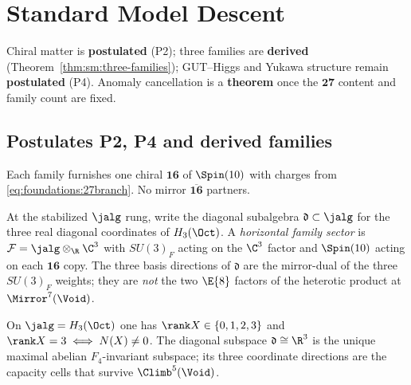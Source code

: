 \section{Standard Model Descent}
\label{sec:sm}

Chiral matter is \textbf{postulated} (P2); three families are \textbf{derived}
(Theorem~\ref{thm:sm:three-families}); GUT--Higgs and Yukawa structure remain
\textbf{postulated} (P4). Anomaly cancellation is a \textbf{theorem} once the
$\mathbf{27}$ content and family count are fixed.

\subsection{Postulates P2, P4 and derived families}
\label{sec:sm:postulates}

\begin{postulate}\label{post:sm:P2}
Each family furnishes one chiral $\mathbf{16}$ of $\Spin(10)$ with charges from
\eqref{eq:foundations:27branch}. No mirror $\overline{\mathbf{16}}$ partners.
\end{postulate}


\begin{definition}\label{def:sm:horizontal}
At the stabilized $\jalg$ rung, write the diagonal subalgebra
$\mathfrak{d}\subset\jalg$ for the three real diagonal coordinates of
$H_3(\Oct)$. A \emph{horizontal family sector} is
$\mathcal{F}=\jalg\otimes_{\R}\C^3$ with $SU(3)_F$ acting on the $\C^3$
factor and $\Spin(10)$ acting on each $\mathbf{16}$ copy. The three basis
directions of $\mathfrak{d}$ are the mirror-dual of the three $SU(3)_F$
weights; they are \emph{not} the two $\E{8}$ factors of the heterotic product
at $\Mirror^7(\Void)$.
\end{definition}

\begin{lemma}\label{lem:sm:rank3}
On $\jalg=H_3(\Oct)$ one has $\rank X\in\{0,1,2,3\}$ and
$\rank X=3\iff N(X)\neq0$. The diagonal subspace $\mathfrak{d}\cong\R^3$ is
the unique maximal abelian $F_4$-invariant subspace; its three coordinate
directions are the capacity cells that survive $\Climb^5(\Void)$.
\end{lemma}

